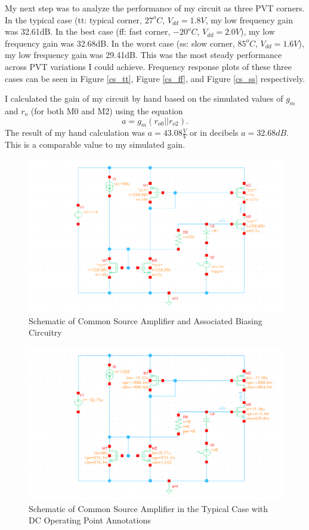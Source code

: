 \documentclass{article}
\begin{document}
My next step was to analyze the performance of my circuit as three PVT corners. In the typical case (tt: typical corner, $27^oC$, $V_{dd} = 1.8V$, my low frequency gain was 32.61dB. In the best case (ff: fast corner, $-20^oC$, $V_{dd} = 2.0V$), my low frequency gain was 32.68dB. In the worst case (ss: slow corner, $85^oC$, $V_{dd} = 1.6V$), my low frequency gain was 29.41dB. This was the most steady performance across PVT variations I could achieve. Frequency response plots of these three cases can be seen in Figure \ref{cs_tt}, Figure \ref{cs_ff}, and Figure \ref{cs_ss} respectively.

I calculated the gain of my circuit by hand based on the simulated values of $g_m$ and $r_o$ (for both M0 and M2) using the equation
\begin{equation}
a = g_m(r_{o0} || r_{o2}).
\end{equation}
The result of my hand calculation was $a = 43.08\frac{V}{V}$ or in decibels $a = 32.68dB$. This is a comparable value to my simulated gain.

\begin{figure}[H]
\centering
\includegraphics[width=6in]{2_cs_schematic.png}
\caption{Schematic of Common Source Amplifier and Associated Biasing Circuitry}
\label{cs_schem}
\end{figure}

\begin{figure}[H]
\centering
\includegraphics[width=6in]{2_cs_dcop.png}
\caption{Schematic of Common Source Amplifier in the Typical Case with DC Operating Point Annotations}
\label{cs_dcop}
\end{figure}
\end{document}
